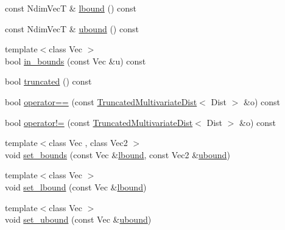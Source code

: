 \begin{DoxyCompactItemize}
\item 
const Ndim\+VecT \& \hyperlink{classprior__hessian_1_1TruncatedMultivariateDist_ab66c6542efa3e4c4b302c3412def22da}{lbound} () const 
\item 
const Ndim\+VecT \& \hyperlink{classprior__hessian_1_1TruncatedMultivariateDist_a9ac92816ee8fb9c9c0c174e961bbfc81}{ubound} () const 
\item 
{\footnotesize template$<$class Vec $>$ }\\bool \hyperlink{classprior__hessian_1_1TruncatedMultivariateDist_a9d32505c0b81e21ad6faa952e9c7bc17}{in\+\_\+bounds} (const Vec \&u) const 
\item 
bool \hyperlink{classprior__hessian_1_1TruncatedMultivariateDist_a522358f03394bda9f5d6d57e06929b78}{truncated} () const 
\item 
bool \hyperlink{classprior__hessian_1_1TruncatedMultivariateDist_a09d66643d2739cf7177f2983c81c7499}{operator==} (const \hyperlink{classprior__hessian_1_1TruncatedMultivariateDist}{Truncated\+Multivariate\+Dist}$<$ Dist $>$ \&o) const 
\item 
bool \hyperlink{classprior__hessian_1_1TruncatedMultivariateDist_a39195d97495c8fb46d14659bfa70c837}{operator!=} (const \hyperlink{classprior__hessian_1_1TruncatedMultivariateDist}{Truncated\+Multivariate\+Dist}$<$ Dist $>$ \&o) const 
\item 
{\footnotesize template$<$class Vec , class Vec2 $>$ }\\void \hyperlink{classprior__hessian_1_1TruncatedMultivariateDist_a89f539c3726a5f5d926a5a1b1703a4e7}{set\+\_\+bounds} (const Vec \&\hyperlink{classprior__hessian_1_1TruncatedMultivariateDist_ab66c6542efa3e4c4b302c3412def22da}{lbound}, const Vec2 \&\hyperlink{classprior__hessian_1_1TruncatedMultivariateDist_a9ac92816ee8fb9c9c0c174e961bbfc81}{ubound})
\item 
{\footnotesize template$<$class Vec $>$ }\\void \hyperlink{classprior__hessian_1_1TruncatedMultivariateDist_a91933e4255f31a6cf1d4d038b09c3527}{set\+\_\+lbound} (const Vec \&\hyperlink{classprior__hessian_1_1TruncatedMultivariateDist_ab66c6542efa3e4c4b302c3412def22da}{lbound})
\item 
{\footnotesize template$<$class Vec $>$ }\\void \hyperlink{classprior__hessian_1_1TruncatedMultivariateDist_a5b379a2c5348dec636b362a734ff2536}{set\+\_\+ubound} (const Vec \&\hyperlink{classprior__hessian_1_1TruncatedMultivariateDist_a9ac92816ee8fb9c9c0c174e961bbfc81}{ubound})
\item 

\end{DoxyCompactItemize}
